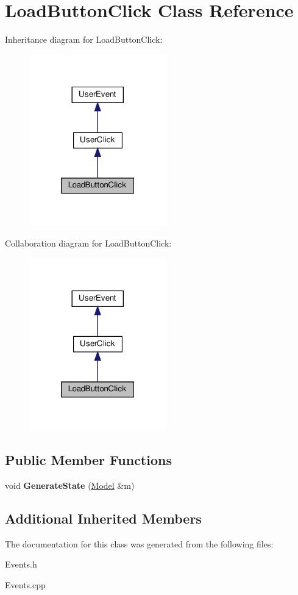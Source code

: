 \hypertarget{classLoadButtonClick}{}\section{Load\+Button\+Click Class Reference}
\label{classLoadButtonClick}


Inheritance diagram for Load\+Button\+Click\+:\nopagebreak
\begin{figure}[H]
\begin{center}
\leavevmode
\includegraphics[width=169pt]{classLoadButtonClick__inherit__graph}
\end{center}
\end{figure}


Collaboration diagram for Load\+Button\+Click\+:\nopagebreak
\begin{figure}[H]
\begin{center}
\leavevmode
\includegraphics[width=169pt]{classLoadButtonClick__coll__graph}
\end{center}
\end{figure}
\subsection*{Public Member Functions}
\begin{DoxyCompactItemize}
\item 
\mbox{\label{classLoadButtonClick_abf958aa98299d099ef1a9e3714e02143}} 
void {\bfseries Generate\+State} (\hyperlink{classModel}{Model} \&m)
\end{DoxyCompactItemize}
\subsection*{Additional Inherited Members}


The documentation for this class was generated from the following files\+:\begin{DoxyCompactItemize}
\item 
Events.\+h\item 
Events.\+cpp\end{DoxyCompactItemize}
